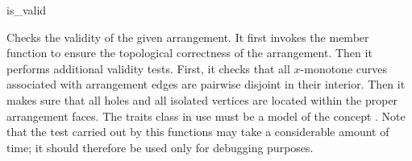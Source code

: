 \ccRefPageBegin

\begin{ccRefFunction}{is_valid}

\ccDefinition

Checks the validity of the given arrangement. It first invokes the
member function  to ensure the topological correctness
of the arrangement. Then it performs additional validity tests. First, it
checks that all $x$-monotone curves associated with arrangement edges are
pairwise disjoint in their interior. Then it makes sure that all holes and
all isolated vertices are located within the proper arrangement faces.
The traits class in use must be a model of the concept
. Note that the test carried out by this
functions may take a considerable amount of time; it should therefore be
used only for debugging purposes.



\end{ccRefFunction}

\ccRefPageEnd
